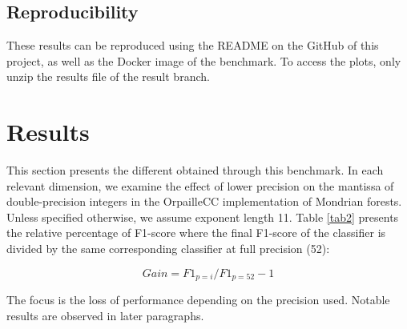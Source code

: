 \documentclass[conference]{IEEEtran}
\begin{document}
\subsection{Reproducibility}

These results can be reproduced using the README on the GitHub of this project,
as well as the Docker image of the benchmark. To access the plots, only unzip
the results file of the result branch.

\section{Results}

This section presents the different obtained through this benchmark. In each
relevant dimension, we examine the effect of lower precision on the mantissa of
double-precision integers in the OrpailleCC implementation of Mondrian forests.
Unless specified otherwise, we assume exponent length 11. Table \ref{tab2}
presents the relative percentage of F1-score where the final F1-score of the
classifier is divided by the same corresponding classifier at full precision
(52):

\begin{equation}
    Gain = F1_{p=i} / F1_{p=52}-1 \label{eq3}
\end{equation}

The focus is the loss of performance depending on the precision used. Notable
results are observed in later paragraphs.
\end{document}
